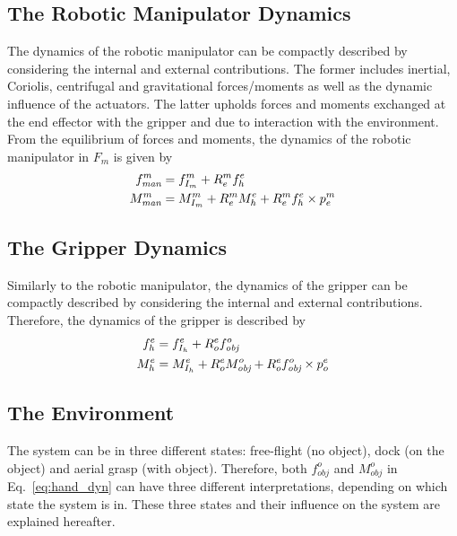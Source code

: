 \documentclass[a4paper, 10pt, conference]{ieeeconf}
\renewcommand{\cdot}{}  %
\begin{document}
\subsection{The Robotic Manipulator Dynamics}
The dynamics of the robotic manipulator can be compactly described by
considering the internal and external contributions. The former
includes inertial, Coriolis, centrifugal and gravitational forces/moments as well as the
dynamic influence of the actuators. The latter upholds forces and
moments exchanged at the end effector with the gripper and due to
interaction with the environment. From the equilibrium of forces and
moments, the dynamics of the robotic manipulator in $F_m$ is given
by
\begin{align}
f_\textit{man}^m &= f_{I_m}^m + R_e^m \cdot f_h^e\notag\\
M_\textit{man}^m &= M_{I_m}^m + R_e^m \cdot M_h^e + R_e^m \cdot f_h^e \times p_e^m
\label{eq:delta}
\end{align}

\subsection{The Gripper Dynamics}
Similarly to the robotic
manipulator, the dynamics of the gripper can be compactly described by considering the internal and external contributions. %
Therefore, the dynamics of the
gripper is described by
\begin{align}
f_h^e &= f_{I_h}^e + R_o^e \cdot f_\textit{obj}^o \notag\\
M_h^e &= M_{I_h}^e + R_o^e \cdot M_\textit{obj}^o + R_o^e \cdot f_\textit{obj}^o \times p_o^e 
\label{eq:hand_dyn}
\end{align}

\subsection{The Environment}
The system can be in three different states: free-flight (no
object), dock (on the object) and aerial grasp (with
object). Therefore, both $f_\textit{obj}^o$ and $M_\textit{obj}^o$ in Eq.~\ref{eq:hand_dyn} can have three different interpretations,
depending on which state the system is in. These three states and
their influence on the system are explained hereafter.
\end{document}
